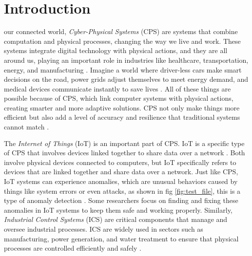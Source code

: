 \section{Introduction}

 our connected world, \emph{Cyber-Physical Systems} (CPS) are systems that combine computation and physical processes, changing the way we live and work. These systems integrate digital technology with physical actions, and they are all around us, playing an important role in industries like healthcare, transportation, energy, and manufacturing \cite{117,118}. Imagine a world where driver-less cars make smart decisions on the road, power grids adjust themselves to meet energy demand, and medical devices communicate instantly to save lives \cite{119}. All of these things are possible because of CPS, which link computer systems with physical actions, creating smarter and more adaptive solutions. CPS not only make things more efficient but also add a level of accuracy and resilience that traditional systems cannot match \cite{120}.

The \emph{Internet of Things} (IoT) is an important part of CPS. IoT is a specific type of CPS that involves devices linked together to share data over a network \cite{121,122}. Both involve physical devices connected to computers, but IoT specifically refers to devices that are linked together and share data over a network. Just like CPS, IoT systems can experience anomalies, which are unusual behaviors caused by things like system errors or even attacks, as shown in fig \ref{fig:test_file}, this is a type of anomaly detection \cite{116,123,124}. Some researchers focus on finding and fixing these anomalies in IoT systems to keep them safe and working properly. Similarly, \emph{Industrial Control Systems} (ICS) are critical components that manage and oversee industrial processes. ICS are widely used in sectors such as manufacturing, power generation, and water treatment to ensure that physical processes are controlled efficiently and safely \cite{125,126,127}.

